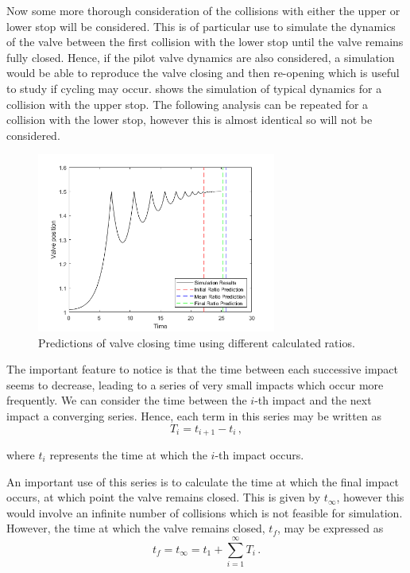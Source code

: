 Now some more thorough consideration of the collisions with either the upper or lower stop will be considered. This is of particular use to simulate the dynamics of the valve between the first collision with the lower stop until the valve remains fully closed. Hence, if the pilot valve dynamics are also considered, a simulation would be able to reproduce the valve closing and then re-opening which is useful to study if cycling may occur.  shows the simulation of typical dynamics for a collision with the upper stop. The following analysis can be repeated for a collision with the lower stop, however this is almost identical so will not be considered.
~
\begin{figure}[ht]
    \centering
    \includegraphics[width=0.7\textwidth]{Figures/ImpactSeries/PositionTime.png}
    \caption{Predictions of valve closing time using different calculated ratios.}
    \label{fig: ImpactPos}
\end{figure}

The important feature to notice is that the time between each successive impact seems to decrease, leading to a series of very small impacts which occur more frequently. We can consider the time between the $i$-th impact and the next impact a converging series. Hence, each term in this series may be written as
~
\begin{equation*}
    T_i = t_{i+1} - t_{i} \, ,
\end{equation*}

where $t_i$ represents the time at which the $i$-th impact occurs.

An important use of this series is to calculate the time at which the final impact occurs, at which point the valve remains closed. This is given by $t_\infty$, however this would involve an infinite number of collisions which is not feasible for simulation. However, the time at which the valve remains closed, $t_f$, may be expressed as
~
\begin{equation*}
    t_f = t_\infty = t_1 + \sum^\infty_{i = 1} T_i \, .
\end{equation*}

